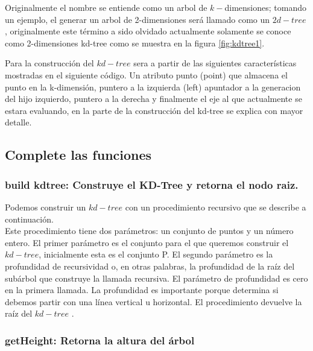 \documentclass{article}
\begin{document}
		Originalmente el nombre se entiende como un arbol de $k-$dimensiones; tomando un ejemplo, el generar un arbol de 2-dimensiones será llamado como un $2d-tree$  \cite{compgeom:2000}, originalmente este término a sido olvidado actualmente solamente se conoce como 2-dimensiones kd-tree como se muestra en la figura \ref{fig:kdtree1}.
		
		Para la construcción del $kd-tree$ sera a partir de las siguientes características mostradas en el siguiente código. Un atributo punto (point) que almacena el punto en la k-dimensión, puntero a la izquierda (left) apuntador a la generacion del hijo izquierdo, puntero a la derecha y finalmente el eje al que actualmente se estara evaluando, en la parte de la construcción del kd-tree se explica con mayor detalle.
		
		
		
		\subsection{Complete las funciones}
		    
		    \subsubsection{build kdtree: Construye el KD-Tree y retorna el nodo raiz.} 
		    
		        Podemos construir un $kd-tree$ con un procedimiento recursivo que se describe a continuación.\\
                Este procedimiento tiene dos parámetros: un conjunto de puntos y un número entero. El primer parámetro es el conjunto para el que queremos construir el $kd-tree$, inicialmente esta es el conjunto P. El segundo parámetro es la profundidad de recursividad o, en otras palabras, la profundidad de la raíz del subárbol que construye la llamada recursiva. El parámetro de profundidad es cero en la primera llamada. La profundidad es importante porque determina si debemos partir con una línea vertical u horizontal. El procedimiento devuelve la raíz del $kd-tree$ \cite{compgeom:2000}.
    		    
    		    
    		    
    		\subsubsection{getHeight: Retorna la altura del árbol} 
    		    
\end{document}
